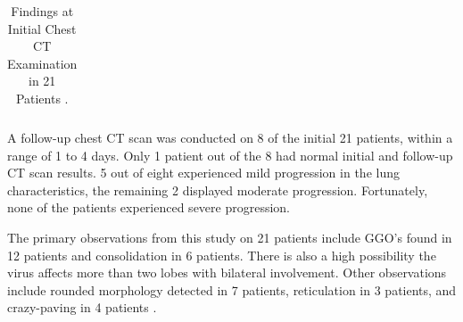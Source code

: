\begin{longtable}{| p{} | p{} |}
 \caption{Findings at Initial Chest CT Examination in 21 Patients  \cite{CMA+2020}.}

    \label{tab:CT Scan Review Results}
    \end{longtable}

% 
\vspace{-2.7em}
A follow-up chest CT scan was conducted on 8 of the initial 21 patients, within 
a range of 1 to 4 days. Only 1 patient out of the 8 had normal initial and 
follow-up CT scan results. 5 out of eight experienced mild progression in 
the lung characteristics, the remaining 2 displayed 
moderate progression. Fortunately, none of the patients experienced severe progression.

The primary observations from this study on 21 patients include GGO's 
found in 12 patients and consolidation in 6 patients. There is also a high possibility 
the virus affects more than two lobes with bilateral involvement. Other 
observations include rounded morphology detected in 7 patients, 
reticulation in 3 patients, and crazy-paving in 4 patients \cite{CMA+2020}.

